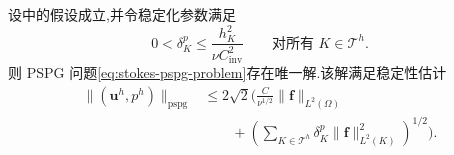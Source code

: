 \begin{lemma}[解的存在唯一性与稳定性估计]\label{lem:stokes-pspg-existence-uniqueness}
设中的假设成立,并令稳定化参数满足
\begin{equation}\label{eq:stokes-pspg-stabilization-bound}
 0<\delta_K^p\leq\frac{h_K^2}{\nu C_{\mathrm{inv}}^2}
 \qquad\text{对所有 }K\in\mathcal{T}^h.
\end{equation}
则 PSPG 问题\cref{eq:stokes-pspg-problem}存在唯一解.该解满足稳定性估计
\begin{equation}\label{eq:stokes-pspg-stability-estimate}
\begin{aligned}
 \| (\bm{u}^h,p^h)\|_{\mathrm{pspg}}
 &\leq 2\sqrt{2}\Biggl(\frac{C}{\nu^{1/2}}\|\bm{f}\|_{L^2(\Omega)}\\
 &\qquad+\left(\sum_{K\in\mathcal{T}^h}\delta_K^p
       \|\bm{f}\|_{L^2(K)}^2\right)^{1/2}\Biggr).
\end{aligned}
\end{equation}
\end{lemma}
